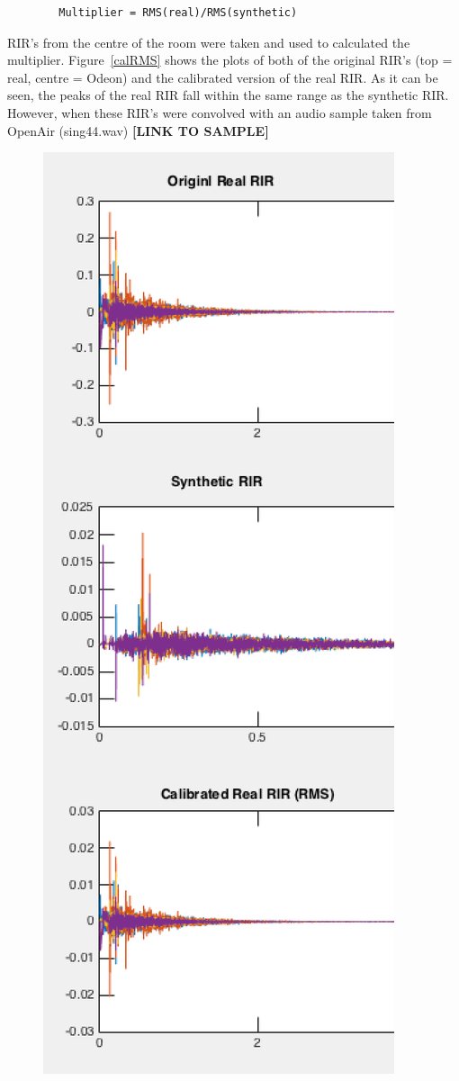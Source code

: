 \documentclass[../../main.tex]{subfiles}
\begin{document}
	\begin{lstlisting}
		Multiplier = RMS(real)/RMS(synthetic)
	\end{lstlisting}

	\ac{RIR}'s from the centre of the room were taken and used to calculated the multiplier. Figure~\ref{calRMS} shows the plots of both of the original \ac{RIR}'s (top = real, centre = Odeon) and the calibrated version of the real \ac{RIR}. As it can be seen, the peaks of the real \ac{RIR} fall within the same range as the synthetic \ac{RIR}. However, when these \ac{RIR}'s were convolved with an audio sample taken from OpenAir (sing44.wav) \textbf{[LINK TO SAMPLE]}

	\begin{figure}[H]
		\begin{center}
			\includegraphics[scale = 0.3]{Sections/Implementation/RealRIRs/images/calibration/CalRMS_RIR_edit.png} 

\end{center}
\end{figure}
\end{document}
